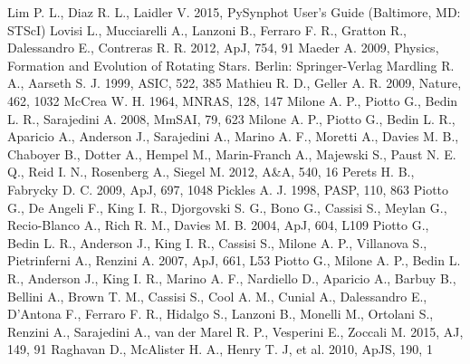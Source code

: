 \documentclass[useAMS,usenatbib]{mnras}
\begin{document}
\begin{thebibliography}{99}
 Lim P. L., Diaz R. L., Laidler V. 2015, PySynphot User's Guide (Baltimore, MD: STScI)
 Lovisi L., Mucciarelli A., Lanzoni B., Ferraro F. R., Gratton R., Dalessandro E., Contreras R. R. 2012, ApJ, 754, 91
 Maeder A. 2009, 
Physics, Formation and Evolution of Rotating Stars. Berlin: Springer-Verlag
 Mardling R. A., Aarseth S. J. 1999, ASIC, 522, 385  
  Mathieu R. D., Geller A. R. 2009, Nature, 462, 1032
 McCrea
  W. H. 1964, MNRAS, 128, 147
  Milone A. P., Piotto G., Bedin L. R., Sarajedini A. 2008, MmSAI, 79,
  623
 Milone A. P., Piotto G.,
Bedin L. R., Aparicio A., Anderson J., Sarajedini A., Marino A. F., Moretti A.,
Davies M. B., Chaboyer B., Dotter A., Hempel M., Marin-Franch A., Majewski S.,
Paust N. E. Q., Reid I. N., Rosenberg A., Siegel M. 2012, A\&A, 540, 16
 Perets H. B., Fabrycky D. C. 2009, ApJ, 697, 1048
 Pickles A. J. 1998, PASP, 110, 863
  Piotto G., De Angeli F., King I. R., Djorgovski S. G., Bono G.,
  Cassisi S., Meylan G., Recio-Blanco A., Rich R. M., Davies M. B. 2004,
  ApJ, 604, L109
Piotto G., Bedin L. R., Anderson J., King I. R., Cassisi S., Milone A. P., Villanova S., Pietrinferni A., Renzini A. 2007, ApJ, 661, L53
  Piotto G., Milone A. P., Bedin L. R., Anderson J., King I. R., Marino A. F., Nardiello D., Aparicio A., Barbuy B., Bellini A., Brown T. M., Cassisi S., Cool A. M., Cunial A., Dalessandro E., D'Antona F., Ferraro F. R., Hidalgo S., Lanzoni B., Monelli M., Ortolani S., Renzini A., Sarajedini A., van der Marel R. P., Vesperini E., Zoccali M. 2015, AJ, 149, 91
 Raghavan D., McAlister H. A., Henry T. J, et al. 2010, ApJS, 190, 1 

\end{thebibliography}
\end{document}
